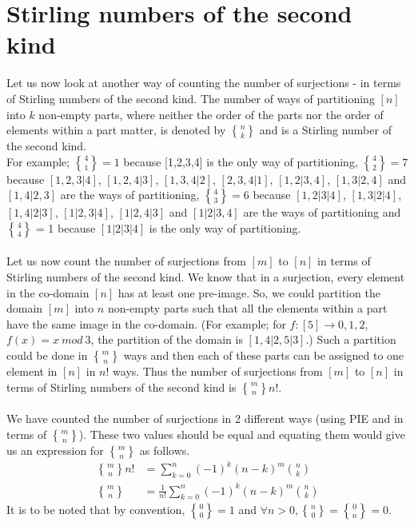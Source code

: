 \section{Stirling numbers of the second kind}
Let us now look at another way of counting the number of surjections - in terms of Stirling numbers of the second kind. The number of ways of partitioning $[n]$ into $k$ non-empty parts, where neither the order of the parts nor the order of elements within a part matter, is denoted by ${n \brace k}$ and is a Stirling number of the second kind. \\
For example; ${4 \brace 1} = 1$ because [1,2,3,4] is the only way of partitioning, ${4 \brace 2} = 7$ because $[1,2,3|4]$, $[1,2,4|3]$, $[1,3,4|2]$, $[2,3,4|1]$, $[1,2|3,4]$, $[1,3|2,4]$ and $[1,4|2,3]$ are the ways of partitioning, ${4 \brace 3} = 6$ because $[1,2|3|4]$, $[1,3|2|4]$, $[1,4|2|3]$, $[1|2,3|4]$, $[1|2,4|3]$ and $[1|2|3,4]$ are the ways of partitioning and ${4 \brace 4}$ = 1 because $[1|2|3|4]$ is the only way of partitioning.\\ \\
Let us now count the number of surjections from $[m]$ to $[n]$ in terms of Stirling numbers of the second kind. We know that in a surjection, every element in the co-domain $[n]$ has at least one pre-image. So, we could partition the domain $[m]$ into $n$ non-empty parts such that all the elements within a part have the same image in the co-domain. (For example; for $f : [5] \rightarrow {0,1,2}$, $f(x) = x ~mod~3 $, the partition of the domain is $[1,4|2,5|3]$.) Such a partition could be done in ${m \brace n}$ ways and then each of these parts can be assigned to one element in $[n]$ in $n!$ ways. Thus the number of surjections from $[m]$ to $[n]$ in terms of Stirling numbers of the second kind is ${m \brace n}n!$. \\ \\
We have counted the number of surjections in 2 different ways (using PIE and in terms of ${m \brace n}$). These two values should be equal and equating them would give us an expression for ${m \brace n}$ as follows.
\begin{align*}
    {m \brace n}n! &= \sum_{k=0}^{n} (-1)^{k} (n-k)^m {n \choose k}\\
    {m \brace n} &= {\frac{1}{n!}}\sum_{k=0}^{n} (-1)^{k} (n-k)^m {n \choose k}
\end{align*}
It is to be noted that by convention, ${0 \brace 0} = 1$ and $\forall n>0, {n \brace 0} = {0 \brace n} = 0$. \\
